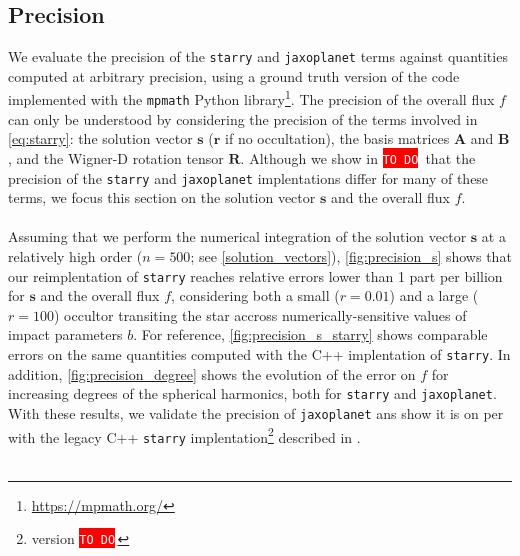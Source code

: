 \documentclass[modern]{aastex631}
\newcommand{\todo}[1]{\colorbox{red}{\textcolor{white}{\texttt{TO DO}}}\,}
\newcommand{\footlink}[1]{\footnote{\url{#1}}}
\begin{document}
\subsection{Precision}
We evaluate the precision of the \texttt{starry} and \texttt{jaxoplanet} terms against quantities computed at arbitrary precision, using a ground truth version of the code implemented with the \texttt{mpmath} Python library\footlink{https://mpmath.org/}. The precision of the overall flux $f$ can only be understood by considering the precision of the terms involved in \autoref{eq:starry}: the solution vector $\bm{s}$ ($\bm{r}$ if no occultation), the basis matrices $\bm{A}$ and $\bm{B}$, and the Wigner-D rotation tensor $\bm{R}$. Although we show in \todo{add an appendix showing errors for these quantities} that the precision of the \texttt{starry} and \texttt{jaxoplanet} implentations differ for many of these terms, we focus this section on the solution vector $\bm{s}$ and the overall flux $f$.\\\\
Assuming that we perform the numerical integration of the solution vector $\bm{s}$ at a relatively high order ($n=500$; see \autoref{solution_vectors}), \autoref{fig:precision_s} shows that our reimplentation of \texttt{starry} reaches relative errors lower than 1 part per billion for $\bm{s}$ and the overall flux $f$, considering both a small ($r=0.01$) and a large ($r=100$) occultor transiting the star accross numerically-sensitive values of impact parameters $b$. For reference, \autoref{fig:precision_s_starry} shows comparable errors on the same quantities computed with the C++ implentation of \texttt{starry}. In addition, \autoref{fig:precision_degree} shows the evolution of the error on $f$ for increasing degrees of the spherical harmonics, both for \texttt{starry} and \texttt{jaxoplanet}. With these results, we validate the precision of \texttt{jaxoplanet} ans show it is on per with the legacy C++ \texttt{starry} implentation\footnote{version \todo{add version number of starry}} described in \cite{starry}.\\\\
\end{document}
